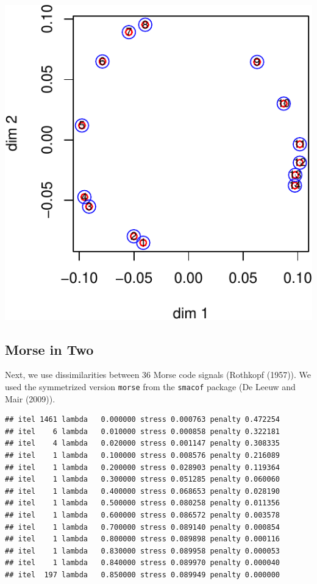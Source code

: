 \documentclass[
  12pt,
]{article}
\begin{document}
\begin{center}\includegraphics{penalty_files/figure-latex/okman-1} \end{center}

\hypertarget{morse-in-two}{%
\subsection{Morse in Two}\label{morse-in-two}}

Next, we use dissimilarities between 36 Morse code signals (Rothkopf
(1957)). We used the symmetrized version \texttt{morse} from the
\texttt{smacof} package (De Leeuw and Mair (2009)).

\begin{verbatim}
## itel 1461 lambda   0.000000 stress 0.000763 penalty 0.472254 
## itel    6 lambda   0.010000 stress 0.000858 penalty 0.322181 
## itel    4 lambda   0.020000 stress 0.001147 penalty 0.308335 
## itel    1 lambda   0.100000 stress 0.008576 penalty 0.216089 
## itel    1 lambda   0.200000 stress 0.028903 penalty 0.119364 
## itel    1 lambda   0.300000 stress 0.051285 penalty 0.060060 
## itel    1 lambda   0.400000 stress 0.068653 penalty 0.028190 
## itel    1 lambda   0.500000 stress 0.080258 penalty 0.011356 
## itel    1 lambda   0.600000 stress 0.086572 penalty 0.003578 
## itel    1 lambda   0.700000 stress 0.089140 penalty 0.000854 
## itel    1 lambda   0.800000 stress 0.089898 penalty 0.000116 
## itel    1 lambda   0.830000 stress 0.089958 penalty 0.000053 
## itel    1 lambda   0.840000 stress 0.089970 penalty 0.000040 
## itel  197 lambda   0.850000 stress 0.089949 penalty 0.000000
\end{verbatim}
\end{document}
